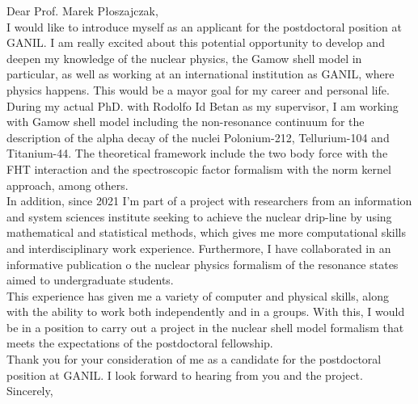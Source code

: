 \subject{Application as postdoctoral fellowship in theoretical nuclear physics at GANIL}
\coverletter[sender=false, vspace=4mm]

Dear Prof. Marek Płoszajczak,\\

I would like to introduce myself as an applicant for the postdoctoral position at GANIL. I am really excited about this potential opportunity to develop and deepen my knowledge of the nuclear physics, the Gamow shell model in particular, as well as working at an international institution as GANIL, where physics happens. This would be a mayor goal for my career and personal life. \\

During my actual PhD. with Rodolfo Id Betan as my supervisor, I am working with Gamow shell model including the non-resonance continuum for the description of the alpha decay of the nuclei Polonium-212, Tellurium-104 and Titanium-44. The theoretical framework include the two body force with the FHT interaction and the spectroscopic factor formalism with the norm kernel approach, among others. \\

In addition, since 2021 I'm part of a project with researchers from an information and system sciences institute seeking to achieve the nuclear drip-line by using mathematical and statistical methods, which gives me more computational skills and interdisciplinary work experience. Furthermore, I have collaborated in an informative publication o the nuclear physics formalism of the resonance states aimed to undergraduate students. \\

This experience has given me a variety of computer and physical skills, along with the ability to work both independently and in a groups. With this, I would be in a position to carry out a project in the nuclear shell model formalism that meets the expectations of the postdoctoral fellowship. \\

Thank you for your consideration of me as a candidate for the postdoctoral position at GANIL. I look forward to hearing from you and the project.\\

Sincerely, 
